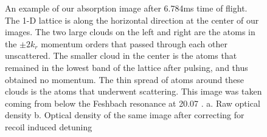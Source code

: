 \documentclass[12pt]{iopart}
\begin{document}
\begin{figure}
\caption{An example of our absorption image after 6.784ms time of flight. The 1-D lattice is along the horizontal direction at the center of our images. The two large clouds on the left and right are the atoms in the $\pm 2k_r$ momentum orders that passed through each other unscattered. The smaller cloud in the center is the atoms that remained in the lowest band of the lattice after pulsing, and thus obtained no momentum. The thin spread of atoms around these clouds is the atoms that underwent scattering.   This image was taken coming from below the Feshbach resonance at 20.07  \mT{}. a. Raw optical density b. Optical density of the same image after correcting for recoil induced detuning}  
\label{fig:SampleCorrection}
\end{figure}
\end{document}
